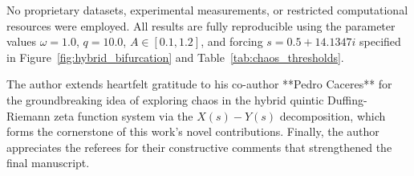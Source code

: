 \documentclass{ws-ijbc}
\begin{document}
No proprietary datasets, experimental measurements, or restricted computational resources were employed. All results are fully reproducible using the parameter values $\omega=1.0$, $q=10.0$, $A\in[0.1,1.2]$, and forcing $s=0.5+14.1347i$ specified in Figure~\ref{fig:hybrid_bifurcation} and Table~\ref{tab:chaos_thresholds}.

























\noindent The author extends heartfelt gratitude to his co-author **Pedro Caceres** for the groundbreaking idea of exploring chaos in the hybrid quintic Duffing-Riemann zeta function system via the $X(s)-Y(s)$ decomposition, which forms the cornerstone of this work's novel contributions. Finally, the author appreciates the referees for their constructive comments that strengthened the final manuscript.
\end{document}
